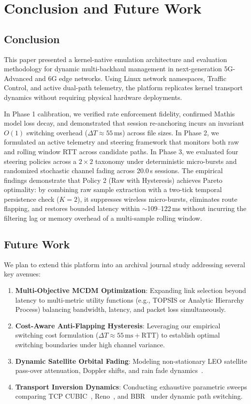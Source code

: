 \documentclass[conference]{IEEEtran}
\begin{document}
\section{Conclusion and Future Work}

\subsection{Conclusion}
This paper presented a kernel-native emulation architecture and evaluation methodology for dynamic multi-backhaul management in next-generation 5G-Advanced and 6G edge networks. Using Linux network namespaces, Traffic Control, and active dual-path telemetry, the platform replicates kernel transport dynamics without requiring physical hardware deployments. 

In Phase 1 calibration, we verified rate enforcement fidelity, confirmed Mathis model loss decay, and demonstrated that session re-anchoring incurs an invariant $O(1)$ switching overhead ($\Delta T \approx 55$\,ms) across file sizes. In Phase 2, we formulated an active telemetry and steering framework that monitors both raw and rolling window RTT across candidate paths. In Phase 3, we evaluated four steering policies across a $2 \times 2$ taxonomy under deterministic micro-bursts and randomized stochastic channel fading across 20.0\,s sessions. The empirical findings demonstrate that Policy 2 (Raw with Hysteresis) achieves Pareto optimality: by combining raw sample extraction with a two-tick temporal persistence check ($K=2$), it suppresses wireless micro-bursts, eliminates route flapping, and restores bounded latency within $\sim$109--122\,ms without incurring the filtering lag or memory overhead of a multi-sample rolling window.

\subsection{Future Work}
We plan to extend this platform into an archival journal study addressing several key avenues:
\begin{enumerate}
    \item \textbf{Multi-Objective MCDM Optimization}: Expanding link selection beyond latency to multi-metric utility functions (e.g., TOPSIS or Analytic Hierarchy Process) balancing bandwidth, latency, and packet loss simultaneously.
    \item \textbf{Cost-Aware Anti-Flapping Hysteresis}: Leveraging our empirical switching cost formulation ($\Delta T \approx 55\,\text{ms} + \text{RTT}$) to establish optimal switching boundaries under high channel variance.
    \item \textbf{Dynamic Satellite Orbital Fading}: Modeling non-stationary LEO satellite pass-over attenuation, Doppler shifts, and rain fade dynamics~\cite{handley2017rethinking}.
    \item \textbf{Transport Inversion Dynamics}: Conducting exhaustive parametric sweeps comparing TCP CUBIC~\cite{ha2008cubic}, Reno~\cite{jacobson1988congestion}, and BBR~\cite{cardwell2016bbr} under dynamic path switching.
\end{enumerate}
\end{document}
